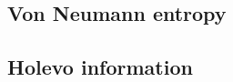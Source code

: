 \subsection{Von Neumann entropy}
\subsection{Holevo information}






\iffalse
%
%
each received $\rho\left[\phi_{j, m}^{\left(B, C\right)}\right]$ and receives complex phase outcome $x_{B,C}\in\mathbb{C}$. In other words, they perform the POVM
\begin{equation}
E\left[x\right] := \otimes_{j=1}^L E_j\left[x\right] \qq{with} E_j\left[x\right] := \frac{1}{\sqrt{\pi}} \ket{x}_j\bra{x}_j
\end{equation}
with $x \in \mathbb{C}$. 
\fi







